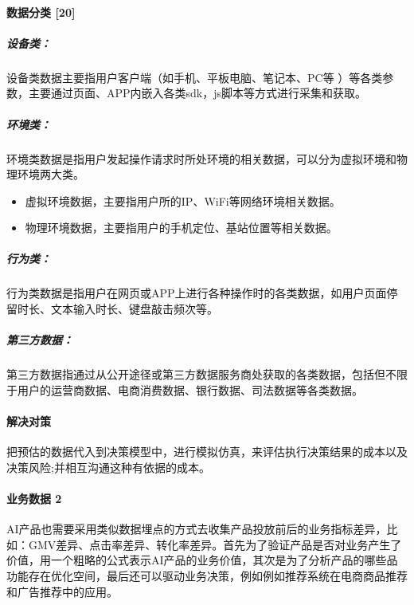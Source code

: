 \documentclass[letterpaper,10pt,english]{sphinxmanual}
\begin{document}
\paragraph{数据分类 {[}20{]}}
\label{\detokenize{chapter_idea/data:id5}}

\subparagraph{设备类：}
\label{\detokenize{chapter_idea/data:id6}}
设备类数据主要指用户客户端（如手机、平板电脑、笔记本、PC等
）等各类参数，主要通过页面、APP内嵌入各类sdk，js脚本等方式进行采集和获取。


\subparagraph{环境类：}
\label{\detokenize{chapter_idea/data:id7}}
环境类数据是指用户发起操作请求时所处环境的相关数据，可以分为虚拟环境和物理环境两大类。
\begin{itemize}
\item {} 
虚拟环境数据，主要指用户所的IP、WiFi等网络环境相关数据。

\item {} 
物理环境数据，主要指用户的手机定位、基站位置等相关数据。

\end{itemize}


\subparagraph{行为类：}
\label{\detokenize{chapter_idea/data:id8}}
行为类数据是指用户在网页或APP上进行各种操作时的各类数据，如用户页面停留时长、文本输入时长、键盘敲击频次等。


\subparagraph{第三方数据：}
\label{\detokenize{chapter_idea/data:id9}}
第三方数据指通过从公开途径或第三方数据服务商处获取的各类数据，包括但不限于用户的运营商数据、电商消费数据、银行数据、司法数据等各类数据。


\paragraph{解决对策}
\label{\detokenize{chapter_idea/data:id10}}
把预估的数据代入到决策模型中，进行模拟仿真，来评估执行决策结果的成本以及决策风险;并相互沟通这种有依据的成本。


\paragraph{业务数据 2\sphinxfootnotemark[378]}
\label{\detokenize{chapter_idea/data:id11}}%
\begin{footnotetext}[378]\sphinxAtStartFootnote
{}
%
\end{footnotetext}\ignorespaces 
AI产品也需要采用类似数据埋点的方式去收集产品投放前后的业务指标差异，比如：GMV差异、点击率差异、转化率差异。首先为了验证产品是否对业务产生了价值，用一个粗略的公式表示AI产品的业务价值，其次是为了分析产品的哪些品功能存在优化空间，最后还可以驱动业务决策，例如例如推荐系统在电商商品推荐和广告推荐中的应用。
\end{document}
